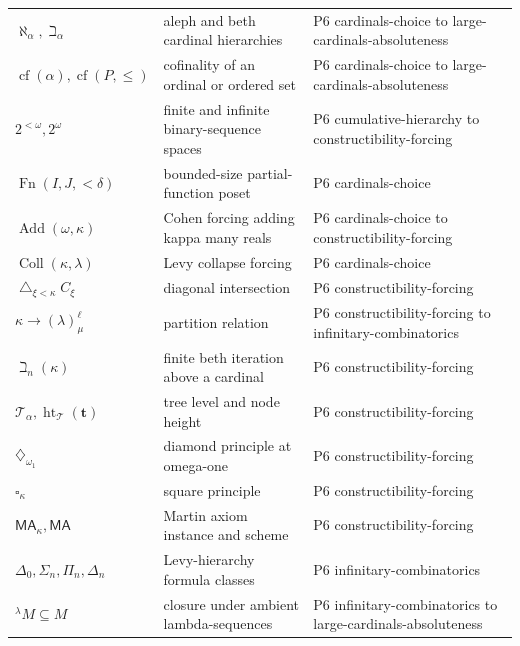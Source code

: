\begin{longtable}{@{}p{}p{}p{}@{}}
\(\aleph_\alpha,\allowbreak \beth_\alpha\) & aleph and beth cardinal hierarchies & P6 cardinals-\allowbreak{}choice to large-\allowbreak{}cardinals-\allowbreak{}absoluteness \\
\(\operatorname{cf}(\alpha),\allowbreak \operatorname{cf}(P,\allowbreak \leq)\) & cofinality of an ordinal or ordered set & P6 cardinals-\allowbreak{}choice to large-\allowbreak{}cardinals-\allowbreak{}absoluteness \\
\(2^{<\omega},\allowbreak 2^\omega\) & finite and infinite binary-sequence spaces & P6 cumulative-\allowbreak{}hierarchy to constructibility-\allowbreak{}forcing \\
\(\operatorname{Fn}(I,\allowbreak J,\allowbreak {<}\delta)\) & bounded-size partial-function poset & P6 cardinals-\allowbreak{}choice \\
\(\operatorname{Add}(\omega,\allowbreak \kappa)\) & Cohen forcing adding kappa many reals & P6 cardinals-\allowbreak{}choice to constructibility-\allowbreak{}forcing \\
\(\operatorname{Coll}(\kappa,\allowbreak \lambda)\) & Levy collapse forcing & P6 cardinals-\allowbreak{}choice \\
\(\mathop{\triangle}_{\xi<\kappa}C_\xi\) & diagonal intersection & P6 constructibility-\allowbreak{}forcing \\
\(\kappa\longrightarrow(\lambda)^\ell_\mu\) & partition relation & P6 constructibility-\allowbreak{}forcing to infinitary-\allowbreak{}combinatorics \\
\(\beth_n(\kappa)\) & finite beth iteration above a cardinal & P6 constructibility-\allowbreak{}forcing \\
\(\mathcal T_\alpha,\allowbreak \operatorname{ht}_{\mathcal T}(\mathbf t)\) & tree level and node height & P6 constructibility-\allowbreak{}forcing \\
\(\diamondsuit_{\omega_1}\) & diamond principle at omega-one & P6 constructibility-\allowbreak{}forcing \\
\(\square_\kappa\) & square principle & P6 constructibility-\allowbreak{}forcing \\
\(\mathsf{MA}_\kappa,\allowbreak \mathsf{MA}\) & Martin axiom instance and scheme & P6 constructibility-\allowbreak{}forcing \\
\(\Delta_0,\allowbreak \Sigma_n,\allowbreak \Pi_n,\allowbreak \Delta_n\) & Levy-hierarchy formula classes & P6 infinitary-\allowbreak{}combinatorics \\
\({}^{\lambda}M\subseteq M\) & closure under ambient lambda-sequences & P6 infinitary-\allowbreak{}combinatorics to large-\allowbreak{}cardinals-\allowbreak{}absoluteness \\

\end{longtable}

